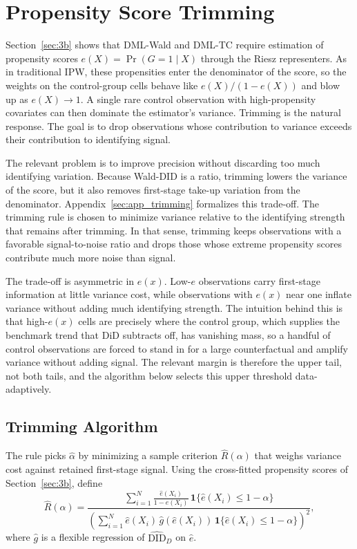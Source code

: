 \section{Propensity Score Trimming}\label{sec:4}

Section~\ref{sec:3b} shows that DML-Wald and DML-TC require estimation of propensity scores $e(X) = \Pr(G = 1 \mid X)$ through the Riesz representers. As in traditional IPW, these propensities enter the denominator of the score, so the weights on the control-group cells behave like $e(X)/(1-e(X))$ and blow up as $e(X) \to 1$. A single rare control observation with high-propensity covariates can then dominate the estimator's variance. Trimming is the natural response. The goal is to drop observations whose contribution to variance exceeds their contribution to identifying signal.

The relevant problem is to improve precision without discarding too much identifying variation. Because Wald-DID is a ratio, trimming lowers the variance of the score, but it also removes first-stage take-up variation from the denominator. Appendix~\ref{sec:app_trimming} formalizes this trade-off. The trimming rule is chosen to minimize variance relative to the identifying strength that remains after trimming. In that sense, trimming keeps observations with a favorable signal-to-noise ratio and drops those whose extreme propensity scores contribute much more noise than signal.

The trade-off is asymmetric in $e(x)$. Low-$e$ observations carry first-stage information at little variance cost, while observations with $e(x)$ near one inflate variance without adding much identifying strength. The intuition behind this is that high-$e(x)$ cells are precisely where the control group, which supplies the benchmark trend that DiD subtracts off, has vanishing mass, so a handful of control observations are forced to stand in for a large counterfactual and amplify variance without adding signal. The relevant margin is therefore the upper tail, not both tails, and the algorithm below selects this upper threshold data-adaptively.

\subsection{Trimming Algorithm}\label{sec:4c}

The rule picks $\hat\alpha$ by minimizing a sample criterion $\hat R(\alpha)$ that weighs variance cost against retained first-stage signal. Using the cross-fitted propensity scores of Section~\ref{sec:3b}, define
\begin{equation}\label{eq:R_criterion}
    \hat R(\alpha)
    = \frac{\sum_{i=1}^N \frac{\hat e(X_i)}{1-\hat e(X_i)}\,\mathbf 1\{\hat e(X_i)\le 1-\alpha\}}{\left(\sum_{i=1}^N \hat e(X_i)\,\hat g(\hat e(X_i))\,\mathbf 1\{\hat e(X_i)\le 1-\alpha\}\right)^{\!2}},
\end{equation}
where $\hat g$ is a flexible regression of $\widehat{\mathrm{DID}}_D$ on $\hat e$.


